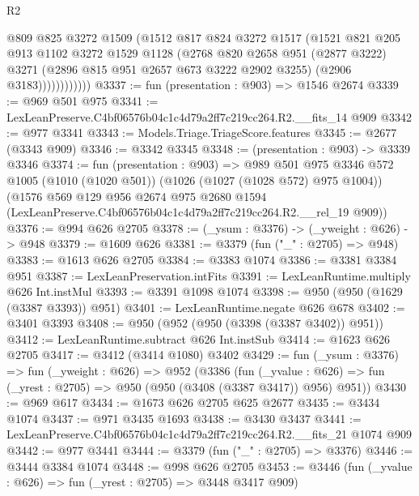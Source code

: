 \begin{lexlean}{R2}
\begin{coremodule}
                    @809
                    @825
                    @3272
                    @1509
                    (@1512
                      @817
                      @824
                      @3272
                      @1517
                      (@1521
                        @821
                        @205
                        @913
                        @1102
                        @3272
                        @1529
                        @1128
                        (@2768
                          @820
                          @2658
                          @951
                          (@2877 @3222)
                          @3271
                          (@2896 @815 @951 @2657 @673 @3222 @2902 @3255)
                          (@2906 @3183))))))))))))
@3337 := fun (presentation : @903) => @1546 @2674
@3339 := @969 @501 @975
@3341 := LexLeanPreserve.C4bf06576b04c1c4d79a2ff7c219cc264.R2.__fits_14 @909
@3342 := @977 @3341
@3343 := Models.Triage.TriageScore.features
@3345 := @2677 (@3343 @909)
@3346 := @3342 @3345
@3348 := (presentation : @903) -> @3339 @3346
@3374 := fun (presentation : @903) =>
  @989
    @501
    @975
    @3346
    @572
    @1005
    (@1010 (@1020 @501))
    (@1026 (@1027 (@1028 @572) @975 @1004))
    (@1576
      @569
      @129
      @956
      @2674
      @975
      @2680
      @1594
      (LexLeanPreserve.C4bf06576b04c1c4d79a2ff7c219cc264.R2.__rel_19 @909))
@3376 := @994 @626 @2705
@3378 := (_ysum : @3376) -> (_yweight : @626) -> @948
@3379 := @1609 @626
@3381 := @3379 (fun ("_" : @2705) => @948)
@3383 := @1613 @626 @2705
@3384 := @3383 @1074
@3386 := @3381 @3384 @951
@3387 := LexLeanPreservation.intFits
@3391 := LexLeanRuntime.multiply @626 Int.instMul
@3393 := @3391 @1098 @1074
@3398 := @950 (@950 (@1629 (@3387 @3393)) @951)
@3401 := LexLeanRuntime.negate @626 @678
@3402 := @3401 @3393
@3408 := @950 (@952 (@950 (@3398 (@3387 @3402)) @951))
@3412 := LexLeanRuntime.subtract @626 Int.instSub
@3414 := @1623 @626 @2705
@3417 := @3412 (@3414 @1080) @3402
@3429 := fun (_ysum : @3376) =>
  fun (_yweight : @626) =>
  @952
    (@3386
      (fun (_yvalue : @626) => fun (_yrest : @2705) => @950 (@950 (@3408 (@3387 @3417)) @956) @951))
@3430 := @969 @617
@3434 := @1673 @626 @2705 @625 @2677
@3435 := @3434 @1074
@3437 := @971 @3435 @1693
@3438 := @3430 @3437
@3441 := LexLeanPreserve.C4bf06576b04c1c4d79a2ff7c219cc264.R2.__fits_21 @1074 @909
@3442 := @977 @3441
@3444 := @3379 (fun ("_" : @2705) => @3376)
@3446 := @3444 @3384 @1074
@3448 := @998 @626 @2705
@3453 := @3446 (fun (_yvalue : @626) => fun (_yrest : @2705) => @3448 @3417 @909)

\end{coremodule}
\end{lexlean}
